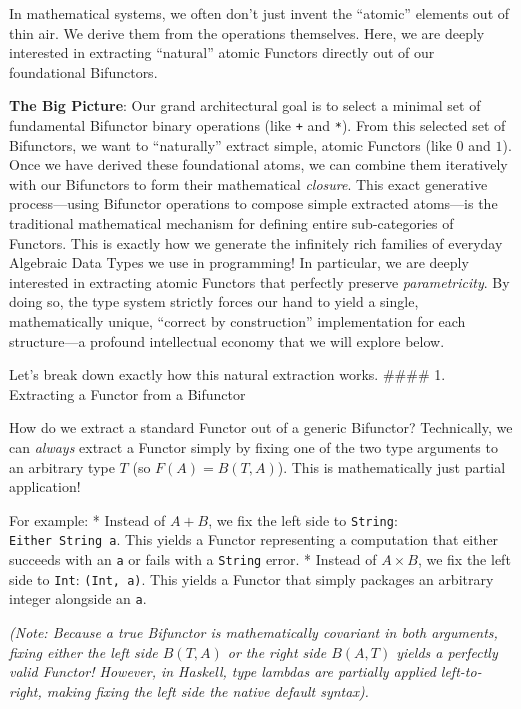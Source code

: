 \documentclass[
]{article}
\begin{document}
In mathematical systems, we often don't just invent the ``atomic''
elements out of thin air. We derive them from the operations themselves.
Here, we are deeply interested in extracting ``natural'' atomic Functors
directly out of our foundational Bifunctors.

\textbf{The Big Picture}: Our grand architectural goal is to select a
minimal set of fundamental Bifunctor binary operations (like \texttt{+}
and \texttt{*}). From this selected set of Bifunctors, we want to
``naturally'' extract simple, atomic Functors (like \(0\) and \(1\)).
Once we have derived these foundational atoms, we can combine them
iteratively with our Bifunctors to form their mathematical
\emph{closure}. This exact generative process---using Bifunctor
operations to compose simple extracted atoms---is the traditional
mathematical mechanism for defining entire sub-categories of Functors.
This is exactly how we generate the infinitely rich families of everyday
Algebraic Data Types we use in programming! In particular, we are deeply
interested in extracting atomic Functors that perfectly preserve
\emph{parametricity}. By doing so, the type system strictly forces our
hand to yield a single, mathematically unique, ``correct by
construction'' implementation for each structure---a profound
intellectual economy that we will explore below.

Let's break down exactly how this natural extraction works. \#\#\#\# 1.
Extracting a Functor from a Bifunctor

How do we extract a standard Functor out of a generic Bifunctor?
Technically, we can \emph{always} extract a Functor simply by fixing one
of the two type arguments to an arbitrary type \(T\) (so
\(F(A) = B(T, A)\)). This is mathematically just partial application!

For example: * Instead of \(A + B\), we fix the left side to
\texttt{String}: \texttt{Either\ String\ a}. This yields a Functor
representing a computation that either succeeds with an \texttt{a} or
fails with a \texttt{String} error. * Instead of \(A \times B\), we fix
the left side to \texttt{Int}: \texttt{(Int,\ a)}. This yields a Functor
that simply packages an arbitrary integer alongside an \texttt{a}.

\emph{(Note: Because a true Bifunctor is mathematically covariant in
both arguments, fixing either the left side \(B(T, A)\) or the right
side \(B(A, T)\) yields a perfectly valid Functor! However, in Haskell,
type lambdas are partially applied left-to-right, making fixing the left
side the native default syntax).}
\end{document}
